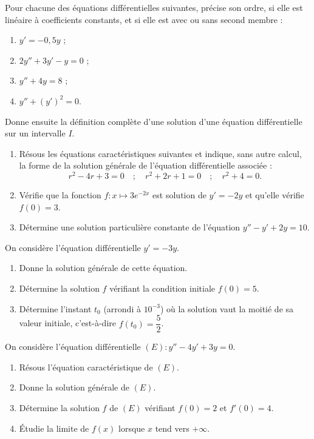 \documentclass[11pt]{article}
\newcommand{\cle}[1]{{\popxbold\color{popdark}#1}}
\newcounter{popsec}
\newcounter{popsub}
\newcommand{\courssub}[1]{%
  \stepcounter{popsub}%
  \par\vspace{9pt}\noindent{\popxbold\fontsize{11.5}{13}\selectfont\color{popink}{\color{poporange}\thepopsec.\thepopsub}\hspace{6pt}#1}\par\nopagebreak\vspace{4pt}
}
\begin{document}
\begin{exercice}
Pour chacune des équations différentielles suivantes, précise son ordre, si elle est linéaire à coefficients constants, et si elle est avec ou sans second membre :
\begin{enumerate}
\item $y' = -0{,}5y$ ;
\item $2y'' + 3y' - y = 0$ ;
\item $y'' + 4y = 8$ ;
\item $y'' + (y')^2 = 0$.
\end{enumerate}
Donne ensuite la définition complète d'une \cle{solution} d'une équation différentielle sur un intervalle $I$.
\end{exercice}

\begin{exercice}
\begin{enumerate}
\item Résous les équations caractéristiques suivantes et indique, sans autre calcul, la forme de la solution générale de l'équation différentielle associée :
\[ r^2 - 4r + 3 = 0 \quad ; \quad r^2 + 2r + 1 = 0 \quad ; \quad r^2 + 4 = 0. \]
\item Vérifie que la fonction $f : x \longmapsto 3e^{-2x}$ est solution de $y' = -2y$ et qu'elle vérifie $f(0) = 3$.
\item Détermine une solution particulière constante de l'équation $y'' - y' + 2y = 10$.
\end{enumerate}
\end{exercice}

\courssub{Je m'entraîne}

\begin{exercice}
On considère l'équation différentielle $y' = -3y$.
\begin{enumerate}
\item Donne la solution générale de cette équation.
\item Détermine la solution $f$ vérifiant la condition initiale $f(0) = 5$.
\item Détermine l'instant $t_0$ (arrondi à $10^{-3}$) où la solution vaut la moitié de sa valeur initiale, c'est-à-dire $f(t_0) = \dfrac{5}{2}$.
\end{enumerate}
\end{exercice}

\begin{exercice}
On considère l'équation différentielle $(E) : y'' - 4y' + 3y = 0$.
\begin{enumerate}
\item Résous l'équation caractéristique de $(E)$.
\item Donne la solution générale de $(E)$.
\item Détermine la solution $f$ de $(E)$ vérifiant $f(0) = 2$ et $f'(0) = 4$.
\item Étudie la limite de $f(x)$ lorsque $x$ tend vers $+\infty$.
\end{enumerate}
\end{exercice}
\end{document}
